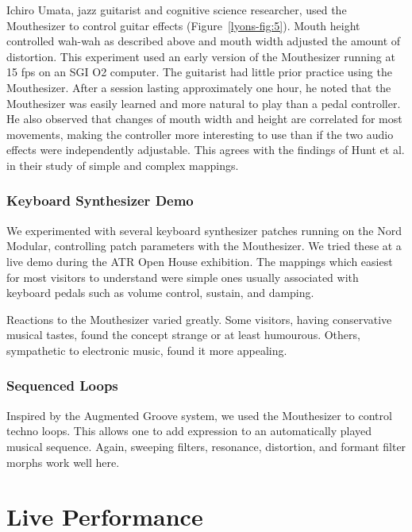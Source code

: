 Ichiro Umata, jazz guitarist and cognitive science researcher, used the Mouthesizer to control guitar effects (Figure~\ref{lyons-fig:5}). Mouth height controlled wah-wah as described above and mouth width adjusted the amount of distortion. This experiment used an early version of the Mouthesizer running at 15 fps on an SGI O2 computer. The guitarist had little prior practice using the Mouthesizer.  After a session lasting approximately one hour, he noted that the Mouthesizer was easily learned and more natural to play than a pedal controller.  He also observed that changes of mouth width and height are correlated for most movements, making the controller more interesting to use than if the two audio effects were independently adjustable. This agrees with the findings of Hunt et al. in their study of simple and complex mappings.

\subsubsection{Keyboard Synthesizer Demo}

We experimented with several keyboard synthesizer patches running on the Nord Modular, controlling patch parameters with the Mouthesizer. We tried these at a live demo during the ATR Open House exhibition. The mappings which easiest for most visitors to understand were simple ones usually associated with keyboard pedals such as volume control, sustain, and damping.

Reactions to the Mouthesizer varied greatly. Some visitors, having conservative musical tastes, found the concept strange or at least humourous. Others, sympathetic to electronic music, found it more appealing. 

\subsubsection{Sequenced Loops}

Inspired by the Augmented Groove system, we used the Mouthesizer to control techno loops. This allows one to add expression to an automatically played musical sequence. Again, sweeping filters, resonance, distortion, and formant filter morphs work well here.  

\section{Live Performance}


